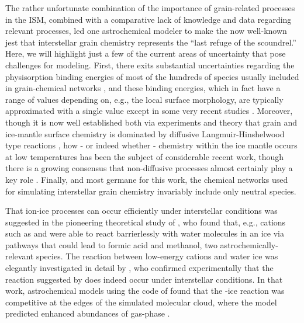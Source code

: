 \documentclass[journal=aesccq,manuscript=draft]{achemso}
\begin{document}
The rather unfortunate combination of the importance of grain-related processes in the ISM, combined with a comparative lack of knowledge and data regarding relevant processes, led one astrochemical modeler to make the now well-known jest that interstellar grain chemistry represents the ``last refuge of the scoundrel\citep{charnley_molecular_1992}.'' Here, we will highlight just a few of the current areas of uncertainty that pose challenges for modeling. First, there exits substantial uncertainties regarding the physisorption binding energies of most of the hundreds of species usually included in grain-chemical networks \citep{cuppen_modelling_2011,lamberts_influence_2017,wakelam_binding_2017}, and these binding energies, which in fact have a range of values depending on, e.g., the local surface morphology, are typically approximated with a single value except in some very recent studies \citep{grassi_novel_2020}. Moreover, though it is now well established both via experiments and theory that grain and ice-mantle surface chemistry is dominated by diffusive Langmuir-Hinshelwood type reactions \citep{qasim_experimental_2020,ioppolo_non-energetic_2020,cuppen_grain_2017,watanabe_efficient_2002}, how - or indeed whether - chemistry within the ice mantle occurs at low temperatures has been the subject of considerable recent work, though there is a growing consensus that non-diffusive processes almost certainly play a key role \citep{theule_thermal_2013,ghesquiere_diffusion_2015,shingledecker_simulating_2019}. Finally, and most germane for this work, the chemical networks used for simulating interstellar grain chemistry invariably include only neutral species.

That ion-ice processes can occur efficiently under interstellar conditions was suggested in the pioneering theoretical study of \citet{woon_ion-ice_2011}, who found that, e.g., cations such as  and  were able to react barrierlessly with water molecules in an ice via pathways that could lead to formic acid and methanol, two astrochemically-relevant species. The reaction between low-energy  cations and water ice was elegantly investigated in detail by \citet{nakai_methanol_2023}, who confirmed experimentally that the reaction suggested by \citet{woon_ion-ice_2011} does indeed occur under interstellar conditions. In that work, astrochemical models using the code of \citet{furuya_water_2015} found that the -ice reaction was competitive at the edges of the simulated molecular cloud, where the model predicted enhanced abundances of gas-phase . 
\end{document}
